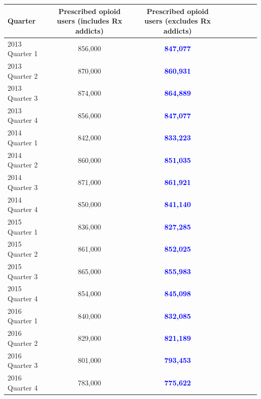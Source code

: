 \documentclass[12pt]{article}
\begin{document}
\begin{tabular}{|l|c|c|c|c|c|c|l}
\hline
\scriptsize
Quarter & \scriptsize{Prescribed opioid users (includes Rx addicts)} &  \scriptsize{Prescribed opioid users (excludes Rx addicts)} \\
\hline
\scriptsize
2013 Quarter 1 & \scriptsize{856,000} & \scriptsize{\textcolor{blue}{\textbf{847,077}}} \\
\scriptsize
2013 Quarter 2 & \scriptsize{870,000} &  \scriptsize{\textcolor{blue}{\textbf{860,931}}}\\
\scriptsize
2013 Quarter 3 & \scriptsize{874,000} &  \scriptsize{\textcolor{blue}{\textbf{864,889}}}\\
\scriptsize
2013 Quarter 4 & \scriptsize{856,000} &  \scriptsize{\textcolor{blue}{\textbf{847,077}}}\\
\scriptsize
2014 Quarter 1 & \scriptsize{842,000} &  \scriptsize{\textcolor{blue}{\textbf{833,223}}}\\
\scriptsize
2014 Quarter 2 & \scriptsize{860,000} &  \scriptsize{\textcolor{blue}{\textbf{851,035}}}\\
\scriptsize
2014 Quarter 3 & \scriptsize{871,000} & \scriptsize{\textcolor{blue}{\textbf{861,921}}}\\
\scriptsize
2014 Quarter 4 & \scriptsize{850,000} &   \scriptsize{\textcolor{blue}{\textbf{841,140}}}\\
\scriptsize
2015 Quarter 1 & \scriptsize{836,000} &  \scriptsize{\textcolor{blue}{\textbf{827,285}}}\\
\scriptsize
2015 Quarter 2 & \scriptsize{861,000} &  \scriptsize{\textcolor{blue}{\textbf{852,025}}}\\
\scriptsize
2015 Quarter 3 & \scriptsize{865,000} &  \scriptsize{\textcolor{blue}{\textbf{855,983}}}\\
\scriptsize
2015 Quarter 4 & \scriptsize{854,000} & \scriptsize{\textcolor{blue}{\textbf{845,098}}}\\
\scriptsize
2016 Quarter 1 & \scriptsize{840,000} & \scriptsize{\textcolor{blue}{\textbf{832,085}}}\\
\scriptsize
2016 Quarter 2 & \scriptsize{829,000} &  \scriptsize{\textcolor{blue}{\textbf{821,189}}}\\
\scriptsize
2016 Quarter 3 & \scriptsize{801,000} &  \scriptsize{\textcolor{blue}{\textbf{793,453}}}\\
\scriptsize
2016 Quarter 4 & \scriptsize{783,000} & \scriptsize{\textcolor{blue}{\textbf{775,622}}}\\

\end{tabular}
\end{document}

